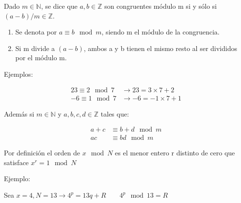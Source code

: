 Dado $m \in \mathds{N}$, se dice que $a,b \in \mathds{Z}$ son congruentes módulo m si y sólo si $(a-b)/m \in \mathds{Z}$.

\begin{enumerate}
    \item Se denota por $a \equiv b \mod m$, siendo m el módulo de la congruencia.
    \item Si m divide a $(a-b)$, ambos a y b tienen el mismo resto al ser divididos por el módulo m.
\end{enumerate}

 Ejemplos:

\begin{align*}
    23 \equiv 2 \mod 7 &\rightarrow 23 = 3 \times 7 + 2 \\
    -6 \equiv 1 \mod 7 &\rightarrow -6 = -1 \times 7 +1
\end{align*}

 Además si $m \in \mathds{N}$ y $a,b,c,d \in \mathds{Z}$ tales que:

\begin{align*}
    a+c &\equiv b+d \mod m \\
    a c &\equiv b d \mod m
\end{align*}

 Por definición el orden de $x \mod N$ es el menor entero r distinto de cero que satisface $x^r = 1 \mod N$
 
Ejemplo:

 Sea $x = 4, N = 13 \rightarrow 4^p = 13 q + R \qquad 4^p \mod 13 = R$

